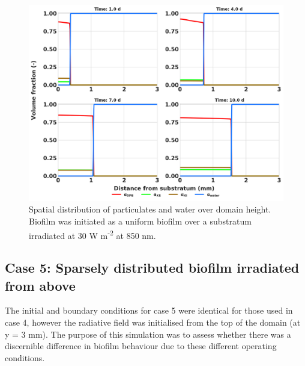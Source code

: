\begin{figure}[H]
    \centering
    \includegraphics[width=\textwidth,height=0.45\textheight]{Chap4/methods/output/case5.png}
    \caption{Spatial distribution of particulates and water over domain height. Biofilm was initiated as a uniform biofilm over a substratum irradiated at 30 W m\textsuperscript{-2} at 850 nm.} 
    \label{fig:case5_dist_frac}
\end{figure}


\subsection{Case 5: Sparsely distributed biofilm irradiated from above}
The initial and boundary conditions for case 5 were identical for those used in case 4, however the radiative field was initialised from the top of the domain (at y = 3 mm). The purpose of this simulation was to assess whether there was a discernible difference in biofilm behaviour due to these different operating conditions. 


